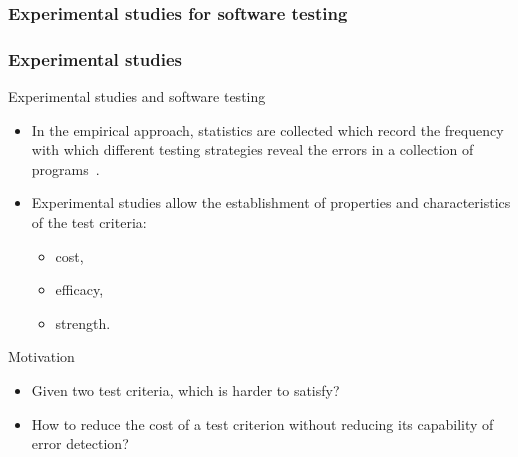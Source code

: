 \begin{frame}[c,parent={cmap:software-testing},hasnext=true,hasprev=false]
\label{cmap:experimental-studies}
\frametitle{Experimental studies for software testing}

\end{frame}


\begin{frame}[parent={cmap:experimental-studies},hasnext=true,hasprev=true]
\frametitle{Experimental studies}
\label{concept:experimental-studies-for-software-testing}

\begin{block:fact}{Experimental studies and software testing}
\begin{itemize}
	\item In the empirical approach, statistics are collected which record the
	frequency with which different testing strategies reveal the errors in a
	collection of programs~\cite{howden:1978}.

	\item Experimental studies allow the establishment of properties and
	characteristics of the test criteria:
	\begin{itemize}
		\item cost,
		\item efficacy,
		\item strength.
	\end{itemize}
\end{itemize}
\end{block:fact}

\begin{block:fact}{Motivation}
\begin{itemize}
	\item Given two test criteria, which is harder to satisfy?

	\item How to reduce the cost of a test criterion without reducing its
	capability of error detection?
\end{itemize}

\hfill
{}
\end{block:fact}
\end{frame}